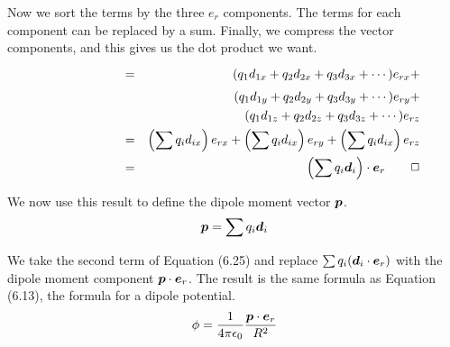 Now we sort the terms by the three $e_r$ components.
The terms for each component can be replaced by a sum.
Finally, we compress the vector components,
and this gives us the dot product we want.
\begin{eqnarray*}
  \phantom{ \sum q_i ( \bv{d}_i \cdot \bv{e}_r )}
  &=& (q_1 d_{1x} + q_2 d_{2x} + q_3 d_{3x} + \cdots) e_{rx} + \\
  & & (q_1 d_{1y} + q_2 d_{2y} + q_3 d_{3y} + \cdots) e_{ry} + \\
  & & (q_1 d_{1z} + q_2 d_{2z} + q_3 d_{3z} + \cdots) e_{rz} \\
  &=& \left(\sum q_i d_{ix} \right) e_{rx} + 
      \left(\sum q_i d_{ix} \right) e_{ry} + 
      \left(\sum q_i d_{ix} \right) e_{rz} \\
  &=& \left( \sum q_i \bv{d}_i \right) \cdot \bv{e}_r \qquad\Box
\end{eqnarray*}

We now use this result to define the dipole moment vector $\boldsymbol{p}$.
\begin{equation}
  \boldsymbol{p} = \sum q_i \boldsymbol{d}_i
\end{equation}

We take the second term of Equation (6.25) and replace
$\sum q_i(\boldsymbol{d}_i\cdot\boldsymbol{e}_r)$ with 
the dipole moment component $\boldsymbol{p}\cdot\boldsymbol{e}_r$.
The result is the same formula as Equation (6.13),
the formula for a dipole potential.
\begin{equation}
  \phi = \frac{1}{4\pi\epsilon_0} \frac{\boldsymbol{p} \cdot \boldsymbol{e}_r}{R^2}
\end{equation}

